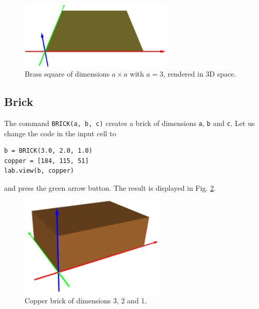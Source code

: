 \begin{figure}[!ht]
\begin{center}
\includegraphics[width=0.65\textwidth]{img/square-112.png}
\end{center}
\vspace{-4mm}
\caption{Brass square of dimensions $a \times a$ with $a = 3$, rendered in 3D space.}
\label{fig:square-112}
\end{figure}
\noindent

\subsection{Brick}

The command {\tt BRICK(a, b, c)} 
creates a brick of dimensions {\tt a}, {\tt b} and {\tt c}. 
Let us change the code in the input cell to  \\

\begin{bbox}
\begin{verbatim}
b = BRICK(3.0, 2.0, 1.0)
copper = [184, 115, 51]
lab.view(b, copper)
\end{verbatim}
\end{bbox}
\vspace{6mm}

\noindent
and press the green arrow button. The result is displayed in Fig. \ref{fig:cuboid-1}.
\newpage

\begin{figure}[!ht]
\begin{center}
\includegraphics[width=0.62\textwidth]{img/cuboid-1.png}
\end{center}
\vspace{-4mm}
\caption{Copper brick of dimensions 3, 2 and 1.}
\label{fig:cuboid-1}
\end{figure}
\noindent

